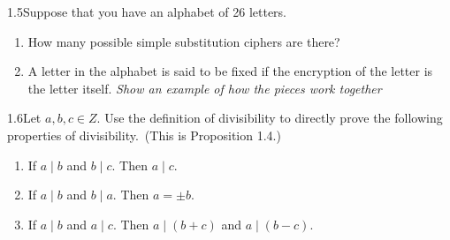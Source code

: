 \begin{exercise}
    {1.5}Suppose that you have an alphabet of 26 letters. 
    \begin{enumerate}
        \item How many possible simple substitution ciphers are there?
        \item A letter in the alphabet is said to be fixed if the encryption of the letter is the letter itself. \textit{Show an example of how the pieces work together}
    \end{enumerate}
\end{exercise}


\begin{exercise}
    {1.6}Let \(a, b, c \in Z\). Use the definition of divisibility to directly prove the following properties of divisibility.\ (This is Proposition 1.4.)
    \begin{enumerate}
        \item If \(a \mid b\) and \(b \mid c\). Then \(a \mid c\).
        \item If \(a \mid b\) and \(b \mid a\). Then \(a = \pm b\).
        \item If \(a \mid b\) and \(a \mid c\). Then \(a \mid (b + c)\) and \(a \mid (b - c)\).
    \end{enumerate}
\end{exercise}

